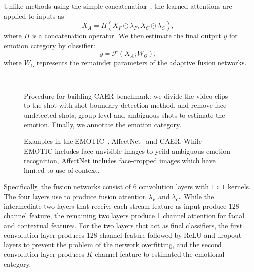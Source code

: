 \documentclass[10pt,twocolumn,letterpaper]{article}
\begin{document}
Unlike methods using the simple concatenation~\cite{kosti2017emotion}, the learned attentions are applied to inputs as
\begin{equation}
X_A = \Pi(X_F \odot \lambda_F, \bar{X}_C \odot \lambda_C),
\end{equation}
where $\Pi$ is a concatenation operator.
We then estimate the final output $y$ for emotion category by classifier:
\begin{equation}
y = \mathcal{F}(X_A; W_G),
\end{equation}
where $W_G$ represents the remainder parameters of the adaptive fusion networks.
\begin{figure}
	\centering
	\renewcommand{\thesubfigure}{}
	\\
	\vspace{-10pt}
	\caption{Procedure for building CAER benchmark: we divide the video clips to the shot with shot boundary detection method, and remove face-undetected shots, group-level and ambiguous shots to estimate the emotion. Finally, we annotate the emotion category.}\label{fig:5}\vspace{-10pt}
\end{figure}

\begin{figure*}
	\centering
	\renewcommand{\thesubfigure}{}
	\vspace{-5pt}
	\caption{Examples in the EMOTIC~\cite{kosti2017emotion}, AffectNet~\cite{mollahosseiniaffectnet} and CAER. While EMOTIC includes face-unvisible images to yeild ambiguous emotion recognition, AffectNet includes face-cropped images which have limited to use of context.}
	\label{fig:6}\vspace{-5pt}
\end{figure*}

Specifically, the fusion networks consist of 6 convolution layers with $1 \times 1$ kernels.
The four layers use to produce fusion attention $\lambda_{F}$ and $\lambda_{C}$.
While the intermediate two layers that receive each stream feature as input produce 128 channel feature, the remaining two layers produce 1 channel attention for facial and contextual features.
For the two layers that act as final classifiers, the first convolution layer produces 128 channel feature followed by ReLU and dropout layers to prevent the problem of the network overfitting, and the second convolution layer produces $K$ channel feature to estimated the emotional category.
\end{document}
